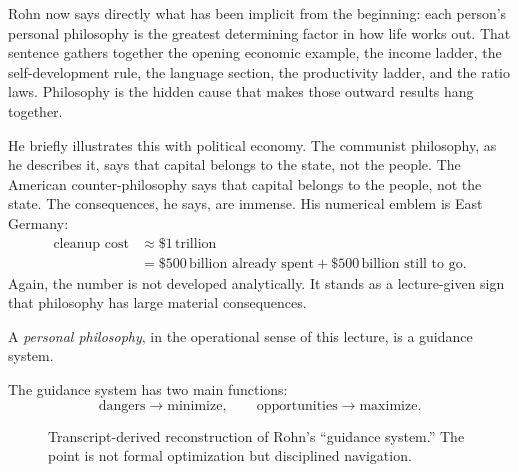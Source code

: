 Rohn now says directly what has been implicit from the beginning: each person's personal philosophy is the greatest determining factor in how life works out. That sentence gathers together the opening economic example, the income ladder, the self-development rule, the language section, the productivity ladder, and the ratio laws. Philosophy is the hidden cause that makes those outward results hang together.

He briefly illustrates this with political economy. The communist philosophy, as he describes it, says that capital belongs to the state, not the people. The American counter-philosophy says that capital belongs to the people, not the state. The consequences, he says, are immense. His numerical emblem is East Germany:
\begin{align}
\text{cleanup cost} &\approx \$1\,\text{trillion} \\
&= \$500\,\text{billion already spent} + \$500\,\text{billion still to go}.
\end{align}
Again, the number is not developed analytically. It stands as a lecture-given sign that philosophy has large material consequences.

\begin{definition}
A \emph{personal philosophy}, in the operational sense of this lecture, is a guidance system.
\end{definition}

The guidance system has two main functions:
\begin{equation}
\text{dangers} \to \text{minimize}, \qquad
\text{opportunities} \to \text{maximize}.
\end{equation}

\begin{figure}[t]
\centering
{}
\caption{Transcript-derived reconstruction of Rohn's ``guidance system.'' The point is not formal optimization but disciplined navigation.}
\end{figure}

